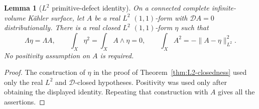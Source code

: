 \documentclass[11pt]{article}
\newtheorem{lemma}[theorem]{Lemma}
\theoremstyle{remark}
\newcommand{\D}{\mathcal D}
\begin{document}
\begin{lemma}[$L^2$ primitive-defect identity]\label{lem:L2-defect}
On a connected complete infinite-volume K\"ahler surface, let $A$ be
a real $L^2$ $(1,1)$-form with $\D A=0$ distributionally. There is a
real closed $L^2$ $(1,1)$-form $\eta$ such that
\[
 \Lambda\eta=\Lambda A,\qquad
 \int_X\eta^2=\int_X A\wedge\eta=0,
 \qquad
 \int_X A^2=-\|A-\eta\|_{L^2}^2.
\]
No positivity assumption on $A$ is required.
\end{lemma}

\begin{proof}
The construction of $\eta$ in the proof of Theorem~\ref{thm:L2-closedness} used only the real $L^2$ and $\D$-closed hypotheses. Positivity was used only after obtaining the displayed identity. Repeating that construction with $A$ gives all the assertions.
\end{proof}
\end{document}
